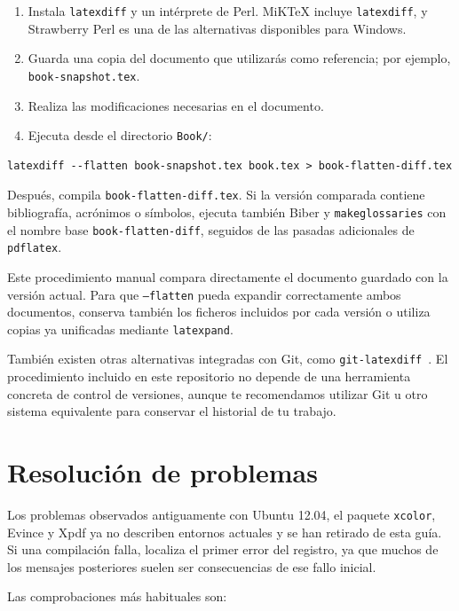 \begin{enumerate}
  \item Instala \texttt{latexdiff} y un intérprete de Perl. MiKTeX incluye \texttt{latexdiff}, y Strawberry Perl es una de las alternativas disponibles para Windows.
  \item Guarda una copia del documento que utilizarás como referencia; por ejemplo, \texttt{book-snapshot.tex}.
  \item Realiza las modificaciones necesarias en el documento.
  \item Ejecuta desde el directorio \texttt{Book/}:
\end{enumerate}

\begin{verbatim}
latexdiff --flatten book-snapshot.tex book.tex > book-flatten-diff.tex
\end{verbatim}

Después, compila \texttt{book-flatten-diff.tex}. Si la versión comparada contiene bibliografía, acrónimos o símbolos, ejecuta también Biber y \texttt{makeglossaries} con el nombre base \texttt{book-flatten-diff}, seguidos de las pasadas adicionales de \texttt{pdflatex}.

Este procedimiento manual compara directamente el documento guardado con la versión actual. Para que \texttt{--flatten} pueda expandir correctamente ambos documentos, conserva también los ficheros incluidos por cada versión o utiliza copias ya unificadas mediante \texttt{latexpand}.

También existen otras alternativas integradas con Git, como \texttt{git-latexdiff}~\cite{git-latexdiff}. El procedimiento incluido en este repositorio no depende de una herramienta concreta de control de versiones, aunque te recomendamos utilizar Git u otro sistema equivalente para conservar el historial de tu trabajo.

\section{Resolución de problemas}
\label{sec:problemas-conocidos}

Los problemas observados antiguamente con Ubuntu 12.04, el paquete \texttt{xcolor}, Evince y Xpdf ya no describen entornos actuales y se han retirado de esta guía. Si una compilación falla, localiza el primer error del registro, ya que muchos de los mensajes posteriores suelen ser consecuencias de ese fallo inicial.

Las comprobaciones más habituales son:

